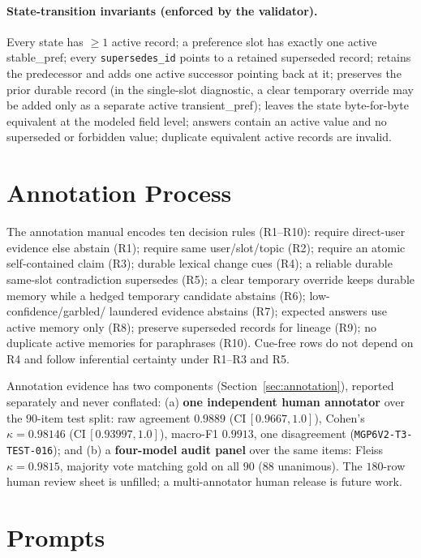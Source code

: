 \paragraph{State-transition invariants (enforced by the validator).}
Every state has $\ge 1$ active record; a preference slot has exactly one active
\textsf{stable\_pref}; every \texttt{supersedes\_id} points to a retained
\textsf{superseded} record; \supersede{} retains the predecessor and adds one
active successor pointing back at it; \keep{} preserves the prior durable record
(in the single-slot diagnostic, a clear temporary override may be added only as a separate active
\textsf{transient\_pref}); \abstain{} leaves the state byte-for-byte equivalent at
the modeled field level; answers contain an active value and no superseded or
forbidden value; duplicate equivalent active records are invalid.

\section{Annotation Process}
\label{app:annotation}

The annotation manual encodes ten decision rules (R1--R10): require direct-user
evidence else abstain (R1); require same user/slot/topic (R2); require an atomic
self-contained claim (R3); durable lexical change cues (R4); a reliable durable
same-slot contradiction supersedes (R5); a clear temporary override keeps durable
memory while a hedged temporary candidate abstains (R6); low-confidence/garbled/
laundered evidence abstains (R7); expected answers use active memory only (R8);
preserve superseded records for lineage (R9); no duplicate active memories for
paraphrases (R10). Cue-free rows do not depend on R4 and follow inferential
certainty under R1--R3 and R5.

Annotation evidence has two components (Section~\ref{sec:annotation}), reported
separately and never conflated: (a) \textbf{one independent human annotator} over
the $90$-item test split: raw agreement $0.9889$ ($\text{CI}\,[0.9667,1.0]$),
Cohen's $\kappa = 0.98146$ ($\text{CI}\,[0.93997,1.0]$), macro-F1 $0.9913$, one
disagreement (\texttt{MGP6V2-T3-TEST-016}); and (b) a \textbf{four-model audit
panel} over the same items: Fleiss $\kappa = 0.9815$, majority vote matching
gold on all $90$ ($88$ unanimous). The $180$-row human review sheet is unfilled; a
multi-annotator human release is future work.

\section{Prompts}
\label{app:prompts}

